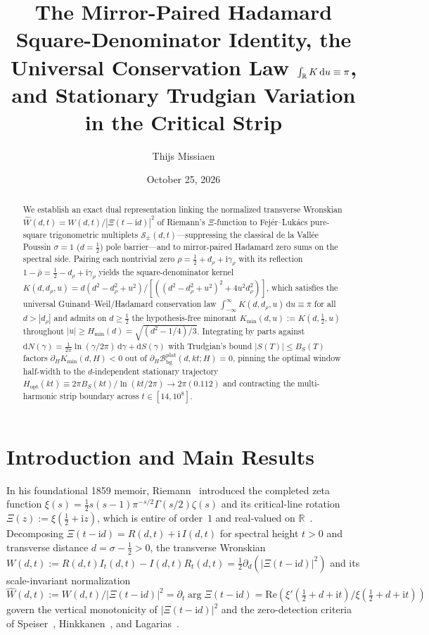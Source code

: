 \documentclass[11pt,reqno]{amsart}
\title[Mirror-Paired Hadamard Kernel and Stationary Trudgian Variation]{The Mirror-Paired Hadamard Square-Denominator Identity, the Universal Conservation Law $\int_{\R} K\,\dd u \equiv \pi$, and Stationary Trudgian Variation in the Critical Strip}
\author{Thijs Missiaen}
\date{October 25, 2026}
\theoremstyle{definition}
\theoremstyle{remark}
\numberwithin{equation}{section}
\newcommand{\R}{\mathbb{R}}
\newcommand{\dd}{\mathrm{d}}
\newcommand{\ii}{\mathrm{i}}
\newcommand{\Rea}{\mathrm{Re}}
\begin{document}
\begin{abstract}
We establish an exact dual representation linking the normalized transverse Wronskian $\widehat{W}(d,t)=W(d,t)/|\Xi(t-\ii d)|^2$ of Riemann's $\Xi$-function to Fej\'er--Luk\'acs pure-square trigonometric multiplets $\mathcal{S}_\pm(d,t)$—suppressing the classical de la Vall\'ee Poussin $\sigma=1$ ($d=\frac{1}{2}$) pole barrier—and to mirror-paired Hadamard zero sums on the spectral side. Pairing each nontrivial zero $\rho=\frac{1}{2}+d_\rho+\ii\gamma_\rho$ with its reflection $1-\bar{\rho}=\frac{1}{2}-d_\rho+\ii\gamma_\rho$ yields the square-denominator kernel $K(d,d_\rho,u)=d(d^2-d_\rho^2+u^2)/[((d^2-d_\rho^2+u^2)^2+4u^2d_\rho^2)]$, which satisfies the universal Guinand--Weil/Hadamard conservation law $\int_{-\infty}^{\infty}K(d,d_\rho,u)\,\dd u\equiv\pi$ for all $d>|d_\rho|$ and admits on $d\ge\frac{1}{2}$ the hypothesis-free minorant $K_{\min}(d,u):=K(d,\frac{1}{2},u)$ throughout $|u|\ge H_{\min}(d)=\sqrt{(d^2-1/4)/3}$. Integrating by parts against $\dd N(\gamma)=\frac{1}{2\pi}\ln(\gamma/2\pi)\,\dd\gamma+\dd S(\gamma)$ with Trudgian's bound $|S(T)|\le B_S(T)$ factors $\partial_H K_{\min}(d,H)<0$ out of $\partial_H\mathcal{B}_{\mathrm{bg}}^{\mathrm{plat}}(d,kt;H)=0$, pinning the optimal window half-width to the $d$-independent stationary trajectory $H_{\mathrm{opt}}(kt)\equiv 2\pi B_S(kt)/\ln(kt/2\pi)\to 2\pi(0.112)$ and contracting the multi-harmonic strip boundary across $t\in[14,10^8]$.
\end{abstract}

\maketitle

\section{Introduction and Main Results}\label{sec:intro}

In his foundational 1859 memoir, Riemann~\cite{riemann1859} introduced the completed zeta function $\xi(s) = \frac{1}{2}s(s-1)\pi^{-s/2}\Gamma(s/2)\zeta(s)$ and its critical-line rotation $\Xi(z) := \xi(\frac{1}{2} + \ii z)$, which is entire of order~$1$ and real-valued on $\R$~\cite{hadamard1893,polya1926,titchmarsh1986}. Decomposing $\Xi(t - \ii d) = R(d,t) + \ii\,I(d,t)$ for spectral height $t > 0$ and transverse distance $d = \sigma - \frac{1}{2} > 0$, the transverse Wronskian $W(d,t) := R(d,t)I_t(d,t) - I(d,t)R_t(d,t) = \frac{1}{2}\partial_d(|\Xi(t - \ii d)|^2)$ and its scale-invariant normalization $\widehat{W}(d,t) := W(d,t)/|\Xi(t - \ii d)|^2 = \partial_t \arg\Xi(t - \ii d) = \Rea(\xi'(\frac{1}{2}+d+\ii t)/\xi(\frac{1}{2}+d+\ii t))$ govern the vertical monotonicity of $|\Xi(t - \ii d)|^2$ and the zero-detection criteria of Speiser~\cite{speiser1934}, Hinkkanen~\cite{hinkkanen1997}, and Lagarias~\cite{lagarias1999}.
\end{document}
